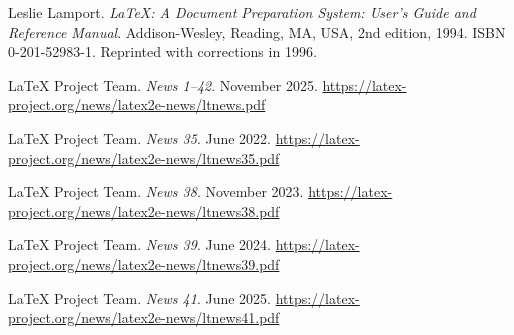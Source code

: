 \documentclass{ltnews}
\begin{document}

\begin{thebibliography}{9}\frenchspacing


Leslie Lamport.
\newblock \emph{{\LaTeX}: {A} Document Preparation System: User's Guide and Reference
  Manual}.
\newblock \mbox{Addison}-Wesley, Reading, MA, USA, 2nd edition, 1994.
\newblock ISBN 0-201-52983-1.
\newblock Reprinted with corrections in 1996.

 \LaTeX{} Project Team.
  \emph{\LaTeXe{} News 1--42}. November 2025.
  \url{https://latex-project.org/news/latex2e-news/ltnews.pdf}

 \LaTeX{} Project Team.
  \emph{\LaTeXe{} News 35}. June 2022.
  \url{https://latex-project.org/news/latex2e-news/ltnews35.pdf}

 \LaTeX{} Project Team.
  \emph{\LaTeXe{} News 38}. November 2023.
  \url{https://latex-project.org/news/latex2e-news/ltnews38.pdf}

 \LaTeX{} Project Team.
  \emph{\LaTeXe{} News 39}. June 2024.
  \url{https://latex-project.org/news/latex2e-news/ltnews39.pdf}

 \LaTeX{} Project Team.
  \emph{\LaTeXe{} News 41}. June 2025.
  \url{https://latex-project.org/news/latex2e-news/ltnews41.pdf}

\end{thebibliography}
\end{document}
